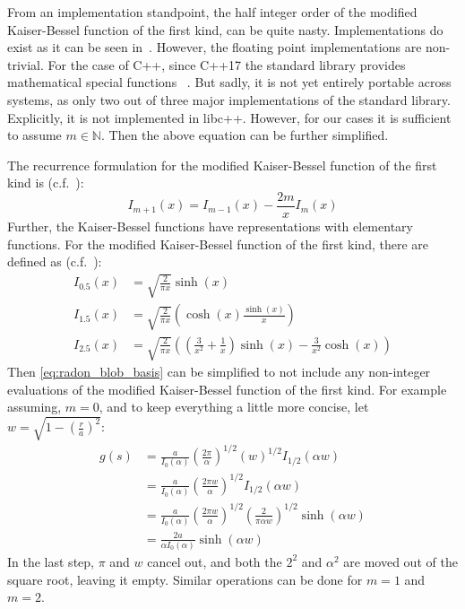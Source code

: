 From an implementation standpoint, the half integer order of the modified Kaiser-Bessel function of
the first kind, can be quite nasty. Implementations do exist as it can be seen
in~\cite{temme_numerical_1975}. However, the floating point implementations are non-trivial. For the
case of C++, since C++17 the standard library provides mathematical special functions
~\cite{noauthor_c_nodate, noauthor_stdcyl_bessel_i_nodate}. But sadly, it is not yet entirely
portable across systems, as only two out of three major implementations of the standard library.
Explicitly, it is not implemented in libc++. However, for our cases it is sufficient to assume \(m
\in \mathbb{N}\). Then the above equation can be further simplified.

The recurrence formulation for the modified Kaiser-Bessel function of the first kind is
(c.f.~\cite[Chapter~9]{abramowitz_handbook_1972}):
\begin{equation}\label{eq:kaiser_bessel_recurrence}
	I_{m+1}(x) = I_{m-1}(x) - \frac{2 m}{x}I_m(x)
\end{equation}
Further, the Kaiser-Bessel functions have representations with elementary functions. For the
modified Kaiser-Bessel function of the first kind, there are defined as (c.f.~\cite[Chapter~10]{abramowitz_handbook_1972}):
\begin{align}\label{eq:kaiser_bessel_half_integer}
	I_{0.5}(x) & = \sqrt{\frac{2}{\pi x}} \sinh(x)                                                                               \\
	I_{1.5}(x) & = \sqrt{\frac{2}{\pi x}} \left( \cosh(x) \frac{\sinh(x)}{x} \right)                                             \\
	I_{2.5}(x) & = \sqrt{\frac{2}{\pi x}} \left(\left(\frac{3}{x^2} + \frac{1}{x}\right)\sinh(x) - \frac{3}{x^2} \cosh(x)\right)
\end{align}
Then \autoref{eq:radon_blob_basis} can be simplified to not include any non-integer evaluations of
the modified Kaiser-Bessel function of the first kind. For example assuming, \(m = 0\), and to keep
everything a little more concise, let \(w = \sqrt{1 - \left(\frac{r}{a}\right)^2}\):
\begin{align}\label{eq:radon_blob_basis_order_0_simplified}
	g(s) & = \frac{a}{I_0(\alpha)} \left(\frac{2\pi}{\alpha}\right)^{1/2} \left( w \right)^{1/2} I_{1/2}\left( \alpha w \right)                     \\
	     & = \frac{a}{I_0(\alpha)} \left(\frac{2\pi w}{\alpha}\right)^{1/2} I_{1/2}\left( \alpha w \right)                                          \\
	     & = \frac{a}{I_0(\alpha)} \left(\frac{2\pi w}{\alpha}\right)^{1/2} \left( \frac{2}{\pi \alpha w}\right)^{1/2} \sinh \left(\alpha w \right) \\
	     & = \frac{2 a}{\alpha I_0(\alpha)} \sinh \left(\alpha w \right)
\end{align}
In the last step, \(\pi\) and \(w\) cancel out, and both the \(2^2\) and \(\alpha^2\) are moved out
of the square root, leaving it empty. Similar operations can be done for \(m = 1\) and \(m = 2\).

